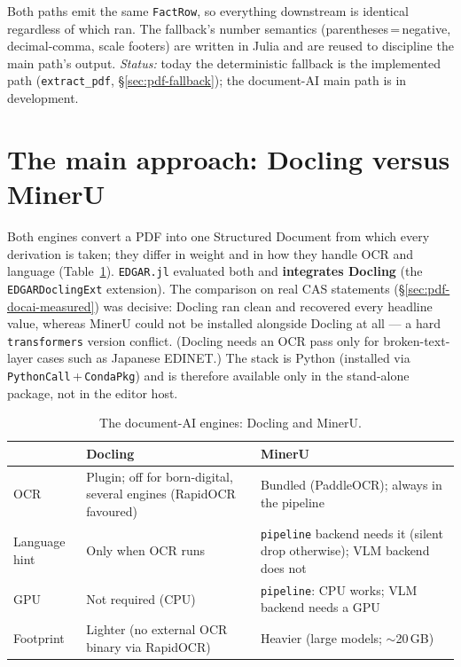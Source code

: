 \documentclass[11pt,a4paper]{report}
\begin{document}
\noindent Both paths emit the same \texttt{FactRow}, so everything downstream is identical regardless of
which ran. The fallback's number semantics (parentheses\,=\,negative, decimal-comma, scale footers) are
written in Julia and are reused to discipline the main path's output. \emph{Status:} today the
deterministic fallback is the implemented path (\texttt{extract\_pdf}, \S\ref{sec:pdf-fallback}); the
document-AI main path is in development.

\section{The main approach: Docling versus MinerU}
\label{sec:pdf-docai}

Both engines convert a PDF into one Structured Document from which every derivation is taken; they differ
in weight and in how they handle OCR and language (Table~\ref{tab:pdf-docai}). \texttt{EDGAR.jl} evaluated
both and \textbf{integrates Docling} (the \texttt{EDGARDoclingExt} extension). The comparison on real CAS
statements (\S\ref{sec:pdf-docai-measured}) was decisive: Docling ran clean and recovered every headline
value, whereas MinerU could not be installed alongside Docling at all --- a hard \texttt{transformers}
version conflict. (Docling needs an OCR pass only for broken-text-layer cases such as Japanese EDINET.) The
stack is Python (installed via
\texttt{PythonCall}\,+\,\texttt{CondaPkg}) and is therefore available only in the stand-alone package, not
in the editor host.

\begin{table}[h]
\centering
\caption{The document-AI engines: Docling and MinerU.}
\label{tab:pdf-docai}
\small
\begin{tabular}{@{}p{}p{}p{}@{}}
\toprule
 & \textbf{Docling} & \textbf{MinerU} \\
\midrule
OCR & Plugin; off for born-digital, several engines (RapidOCR favoured) & Bundled (PaddleOCR); always in the pipeline \\
Language hint & Only when OCR runs & \texttt{pipeline} backend needs it (silent drop otherwise); VLM backend does not \\
GPU & Not required (CPU) & \texttt{pipeline}: CPU works; VLM backend needs a GPU \\
Footprint & Lighter (no external OCR binary via RapidOCR) & Heavier (large models; \(\sim\)20\,GB) \\
\bottomrule
\end{tabular}
\end{table}
\end{document}
